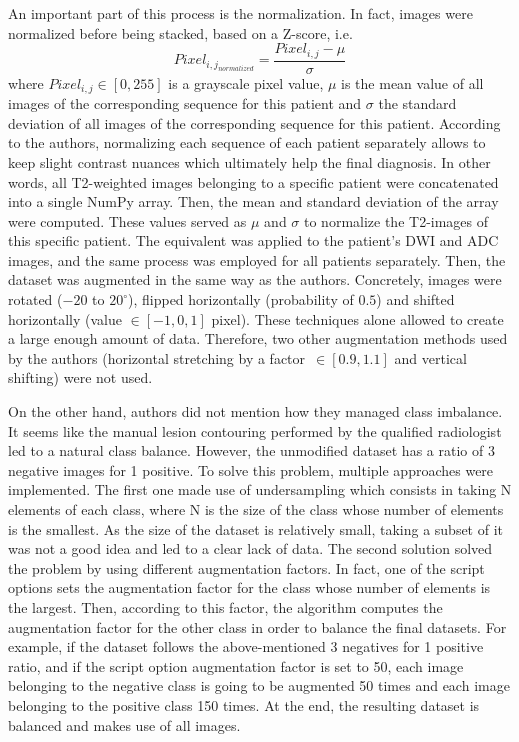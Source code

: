 An important part of this process is the normalization. In fact, images were normalized before being stacked, based on a Z-score, i.e. 
\begin{equation}
\label{eq:normalization}
	Pixel_{{i,j}_{normalized}} = \frac{Pixel_{i,j} - \mu}{\sigma}
\end{equation}
\noindent where $Pixel_{i,j} \in [0,255]$ is a grayscale pixel value, $\mu$ is the mean value of all images of the corresponding sequence for this patient and $\sigma$ the standard deviation of all images of the corresponding sequence for this patient. According to the authors, normalizing each sequence of each patient separately allows to keep slight contrast nuances which ultimately help the final diagnosis. In other words, all T2-weighted images belonging to a specific patient were concatenated into a single NumPy array. Then, the mean and standard deviation of the array were computed. These values served as $\mu$ and $\sigma$ to normalize the T2-images of this specific patient. The equivalent was applied to the patient's DWI and ADC images, and the same process was employed for all patients separately.
Then, the dataset was augmented in the same way as the authors. Concretely, images were rotated ($-20$ to $20^\circ$), flipped horizontally (probability of $0.5$) and shifted horizontally (value $\in [-1, 0, 1]$ pixel). These techniques alone allowed to create a large enough amount of data. Therefore, two other augmentation methods used by the authors (horizontal stretching by a \mbox{factor $\in [0.9,1.1]$} and vertical shifting) were not used.

On the other hand, authors did not mention how they managed class imbalance. It seems like the manual lesion contouring performed by the qualified radiologist led to a natural class balance. However, the unmodified dataset has a ratio of 3 negative images for 1 positive. To solve this problem, multiple approaches were implemented. The first one made use of undersampling which consists in taking N elements of each class, where N is the size of the class whose number of elements is the smallest. As the size of the dataset is relatively small, taking a subset of it was not a good idea and led to a clear lack of data. The second solution solved the problem by using different augmentation factors. In fact, one of the script options sets the augmentation factor for the class whose number of elements is the largest. Then, according to this factor, the algorithm computes the augmentation factor for the other class in order to balance the final datasets. For example, if the dataset follows the above-mentioned 3 negatives for 1 positive ratio, and if the script option augmentation factor is set to 50, each image belonging to the negative class is going to be augmented 50 times and each image belonging to the positive class 150 times. At the end, the resulting dataset is balanced and makes use of all images.

